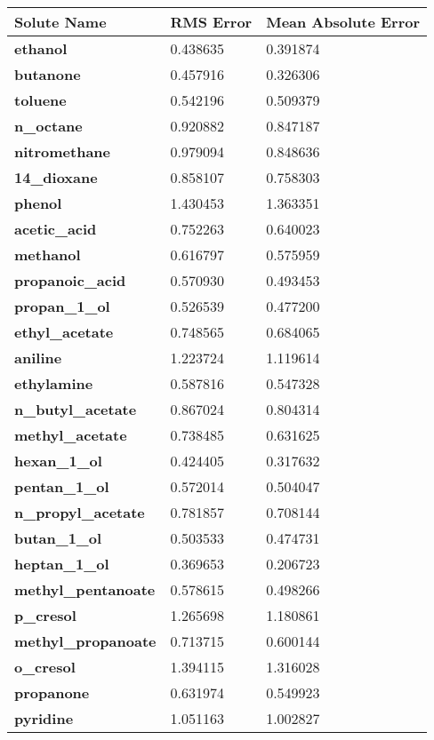 \documentclass{amsart}
\begin{document}
 
\begin{center}
\begin{tabular}{|l|l|l|} 
\hline  
\textbf{Solute Name}&\textbf{RMS Error}&\textbf{Mean Absolute Error} \\ \hline
\hline 
\textbf{ethanol}&0.438635&0.391874 \\ \hline 
\textbf{butanone}&0.457916&0.326306 \\ \hline 
\textbf{toluene}&0.542196&0.509379 \\ \hline 
\textbf{n\_octane}&0.920882&0.847187 \\ \hline 
\textbf{nitromethane}&0.979094&0.848636 \\ \hline 
\textbf{14\_dioxane}&0.858107&0.758303 \\ \hline 
\textbf{phenol}&1.430453&1.363351 \\ \hline 
\textbf{acetic\_acid}&0.752263&0.640023 \\ \hline 
\textbf{methanol}&0.616797&0.575959 \\ \hline 
\textbf{propanoic\_acid}&0.570930&0.493453 \\ \hline 
\textbf{propan\_1\_ol}&0.526539&0.477200 \\ \hline 
\textbf{ethyl\_acetate}&0.748565&0.684065 \\ \hline 
\textbf{aniline}&1.223724&1.119614 \\ \hline 
\textbf{ethylamine}&0.587816&0.547328 \\ \hline 
\textbf{n\_butyl\_acetate}&0.867024&0.804314 \\ \hline 
\textbf{methyl\_acetate}&0.738485&0.631625 \\ \hline 
\textbf{hexan\_1\_ol}&0.424405&0.317632 \\ \hline 
\textbf{pentan\_1\_ol}&0.572014&0.504047 \\ \hline 
\textbf{n\_propyl\_acetate}&0.781857&0.708144 \\ \hline 
\textbf{butan\_1\_ol}&0.503533&0.474731 \\ \hline 
\textbf{heptan\_1\_ol}&0.369653&0.206723 \\ \hline 
\textbf{methyl\_pentanoate}&0.578615&0.498266 \\ \hline 
\textbf{p\_cresol}&1.265698&1.180861 \\ \hline 
\textbf{methyl\_propanoate}&0.713715&0.600144 \\ \hline 
\textbf{o\_cresol}&1.394115&1.316028 \\ \hline 
\textbf{propanone}&0.631974&0.549923 \\ \hline 
\textbf{pyridine}&1.051163&1.002827 \\ \hline 
\end{tabular} 
\end{center} 
\end{document}
